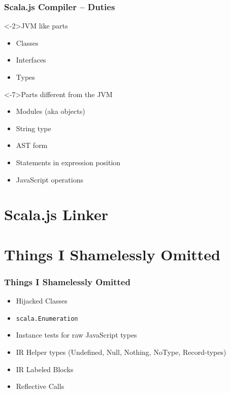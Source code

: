 \documentclass{beamer}
\begin{document}
\begin{frame}
  \frametitle{Scala.js Compiler -- Duties}

  \begin{block}<-2>{JVM like parts }
    \begin{itemize}
    \item Classes
    \item Interfaces
    \item Types
    \end{itemize}
  \end{block}

  \begin{block}<-7>{Parts different from the JVM}
    \begin{itemize}
    \item<-6> Modules (aka objects) 
    \item String type
    \item<-6> AST form 
    \item<-6> Statements in expression position 
    \item JavaScript operations
    \end{itemize}
  \end{block}

\end{frame}

\section{Scala.js Linker}

\begin{frame}
\end{frame}

\section*{Things I Shamelessly Omitted}

\begin{frame}
  \frametitle{Things I Shamelessly Omitted}

  \begin{itemize}
  \item Hijacked Classes
  \item \texttt{scala.Enumeration}
  \item Instance tests for raw JavaScript types
  \item IR Helper types (Undefined, Null, Nothing, NoType, Record-types)
  \item IR Labeled Blocks
  \item Reflective Calls
  \end{itemize}
\end{frame}
\end{document}
